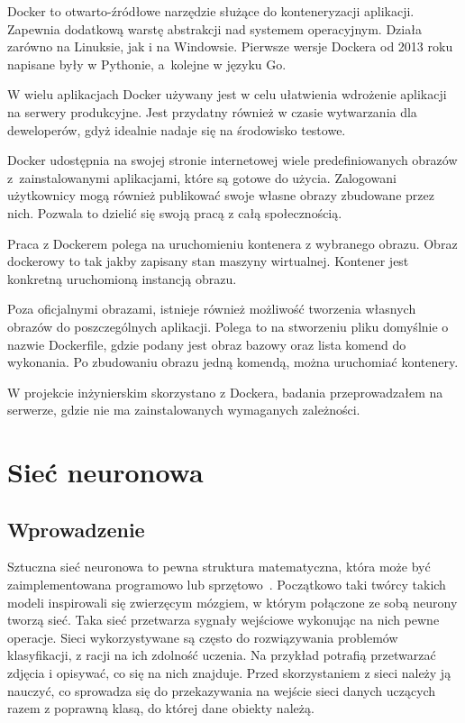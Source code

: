     Docker to otwarto-źródłowe narzędzie służące do konteneryzacji aplikacji.
    Zapewnia dodatkową warstę abstrakcji nad systemem operacyjnym.
    Działa zarówno na Linuksie, jak i na Windowsie.
    Pierwsze wersje Dockera od 2013 roku napisane były w Pythonie, a~kolejne w języku Go.

    W wielu aplikacjach Docker używany jest w celu ułatwienia wdrożenie aplikacji na serwery produkcyjne.
    Jest przydatny również w czasie wytwarzania dla deweloperów, gdyż idealnie nadaje się na środowisko testowe.

    Docker udostępnia na swojej stronie internetowej wiele predefiniowanych obrazów z~zainstalowanymi aplikacjami, które są gotowe do użycia.
    Zalogowani użytkownicy mogą również publikować swoje własne obrazy zbudowane przez nich.
    Pozwala to dzielić się swoją pracą z całą społecznością.

    Praca z Dockerem polega na uruchomieniu kontenera z wybranego obrazu.
    Obraz dockerowy to tak jakby zapisany stan maszyny wirtualnej.
    Kontener jest konkretną uruchomioną instancją obrazu.

    Poza oficjalnymi obrazami, istnieje również możliwość tworzenia własnych obrazów do poszczególnych aplikacji.
    Polega to na stworzeniu pliku domyślnie o nazwie Dockerfile, gdzie podany jest obraz bazowy oraz lista komend do wykonania.
    Po zbudowaniu obrazu jedną komendą, można uruchomiać kontenery.

    W projekcie inżynierskim skorzystano z Dockera, badania przeprowadzałem na serwerze, gdzie nie ma zainstalowanych wymaganych zależności.

    \chapter{Sieć neuronowa}\label{ch:siećNeuronowa}

    \section{Wprowadzenie}\label{sec:wprowadzenie}

    Sztuczna sieć neuronowa to pewna struktura matematyczna, która może być zaimplementowana programowo lub sprzętowo~\cite{neuron}.
    Początkowo taki twórcy takich modeli inspirowali się zwierzęcym mózgiem, w którym połączone ze sobą neurony tworzą sieć.
    Taka sieć przetwarza sygnały wejściowe wykonując na nich pewne operacje.
    Sieci wykorzystywane są często do rozwiązywania problemów klasyfikacji, z racji na ich zdolność uczenia.
    Na przykład potrafią przetwarzać zdjęcia i opisywać, co się na nich znajduje.
    Przed skorzystaniem z sieci należy ją nauczyć, co sprowadza się do przekazywania na wejście sieci danych uczących razem z poprawną klasą, do której dane obiekty należą.

